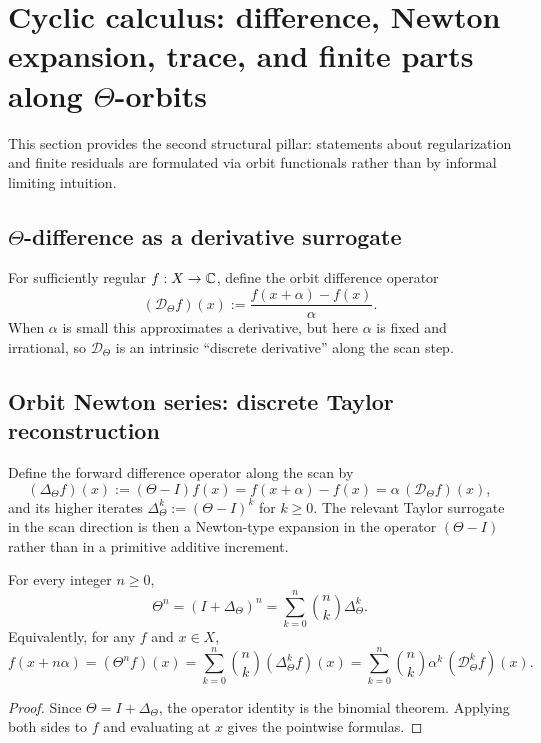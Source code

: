 \section{Cyclic calculus: difference, Newton expansion, trace, and finite parts along \texorpdfstring{$\Theta$}{Theta}-orbits}
\label{sec:cyclic_calculus}

This section provides the second structural pillar: statements about regularization and finite residuals are formulated via orbit functionals rather than by informal limiting intuition.

\subsection{\texorpdfstring{$\Theta$}{Theta}-difference as a derivative surrogate}
For sufficiently regular $f:X\to\mathbb{C}$, define the orbit difference operator
$$
(\mathcal{D}_\Theta f)(x):=\frac{f(x+\alpha)-f(x)}{\alpha}.
$$
When $\alpha$ is small this approximates a derivative, but here $\alpha$ is fixed and irrational, so $\mathcal{D}_\Theta$ is an intrinsic ``discrete derivative'' along the scan step.

\subsection{Orbit Newton series: discrete Taylor reconstruction}
\label{subsec:orbit_newton}
Define the forward difference operator along the scan by
$$
(\Delta_\Theta f)(x):=(\Theta-I)f(x)=f(x+\alpha)-f(x)=\alpha\,(\mathcal{D}_\Theta f)(x),
$$
and its higher iterates $\Delta_\Theta^k:=(\Theta-I)^k$ for $k\ge 0$.
The relevant Taylor surrogate in the scan direction is then a Newton-type expansion in the operator $(\Theta-I)$ rather than in a primitive additive increment.

\begin{proposition}
\label{prop:orbit_binomial_taylor}
For every integer $n\ge 0$,
$$
\Theta^n=(I+\Delta_\Theta)^n=\sum_{k=0}^{n}\binom{n}{k}\Delta_\Theta^k.
$$
Equivalently, for any $f$ and $x\in X$,
$$
f(x+n\alpha)=(\Theta^n f)(x)=\sum_{k=0}^{n}\binom{n}{k}(\Delta_\Theta^k f)(x)
=\sum_{k=0}^{n}\binom{n}{k}\alpha^k\,(\mathcal{D}_\Theta^k f)(x).
$$
\end{proposition}

\begin{proof}
Since $\Theta=I+\Delta_\Theta$, the operator identity is the binomial theorem.
Applying both sides to $f$ and evaluating at $x$ gives the pointwise formulas.
\end{proof}

